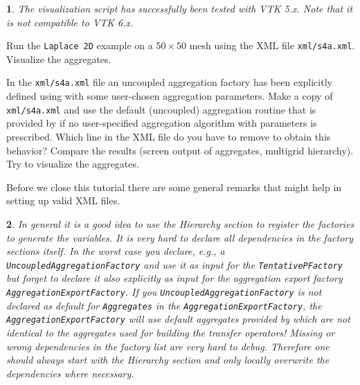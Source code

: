\documentclass[10pt,fleqn]{book}
\newtheorem*{mycomment}{\ding{42}}
\begin{document}
\begin{mycomment}
The visualization script has successfully been tested with VTK 5.x. Note that it is not compatible to VTK 6.x.
\end{mycomment}

\begin{exercise}
Run the \verb|Laplace 2D| example on a $50\times 50$ mesh using the XML file \verb|xml/s4a.xml|. Visualize the aggregates.
\end{exercise}
\begin{exercise}
In the \verb|xml/s4a.xml| file an uncoupled aggregation factory has been explicitly defined using with some user-chosen aggregation parameters. Make a copy of \verb|xml/s4a.xml| and use the default (uncoupled) aggregation routine that is provided by \muelu if no user-specified aggregation algorithm with parameters is prescribed. Which line in the XML file do you have to remove to obtain this behavior? Compare the results (screen output of aggregates, multigrid hierarchy). Try to visualize the aggregates.
\end{exercise}

Before we close this tutorial there are some general remarks that might help in setting up valid XML files.
\begin{mycomment}
In general it is a good idea to use the \textit{Hierarchy} section to register the factories to generate the variables. It is very hard to declare all dependencies in the factory sections itself. In the worst case you declare, e.g., a \verb|UncoupledAggregationFactory| and use it as input for the \verb|TentativePFactory| but forget to declare it also explicitly as input for the aggregation export factory \verb|AggregationExportFactory|. If you \verb|UncoupledAggregationFactory| is not declared as default for \verb|Aggregates| in the \verb|AggregationExportFactory|, the \verb|AggregationExportFactory| will use default aggregates provided by \muelu which are not identical to the aggregates used for building the transfer operators! Missing or wrong dependencies in the factory list are very hard to debug. Therefore one should always start with the \textit{Hierarchy} section and only locally overwrite the dependencies where necessary.
\end{mycomment}
\end{document}
